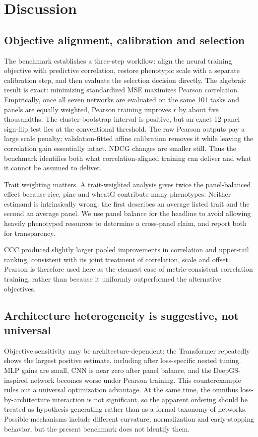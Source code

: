 \section{Discussion}\label{sec:discussion}

\subsection{Objective alignment, calibration and selection}
The benchmark establishes a three-step workflow: align the neural training
objective with predictive correlation, restore phenotypic scale with a separate
calibration step, and then evaluate the selection decision directly. The
algebraic result is exact: minimizing standardized MSE maximizes Pearson
correlation. Empirically, once all seven networks are evaluated on the same 101
tasks and panels are equally weighted, Pearson training improves $r$ by about
five thousandths. The cluster-bootstrap interval is positive, but an exact
12-panel sign-flip test lies at the conventional threshold. The raw Pearson
outputs pay a large scale penalty; validation-fitted affine calibration removes
it while leaving the correlation gain essentially intact. NDCG changes are
smaller still. Thus the benchmark identifies both what correlation-aligned
training can deliver and what it cannot be assumed to deliver.

Trait weighting matters. A trait-weighted analysis gives twice the
panel-balanced effect because rice, pine and wheatG contribute many phenotypes.
Neither estimand is intrinsically wrong: the first describes an average listed
trait and the second an average panel. We use panel balance for the headline to
avoid allowing heavily phenotyped resources to determine a cross-panel claim,
and report both for transparency.

CCC produced slightly larger pooled improvements in correlation and upper-tail
ranking, consistent with its joint treatment of correlation, scale and offset.
Pearson is therefore used here as the cleanest case of metric-consistent
correlation training, rather than because it uniformly outperformed the
alternative objectives.

\subsection{Architecture heterogeneity is suggestive, not universal}
Objective sensitivity may be architecture-dependent: the Transformer repeatedly
shows the largest positive estimate, including after loss-specific nested tuning.
MLP gains are small, CNN is near zero after panel balance, and the DeepGS-inspired
network becomes worse under Pearson training.
This counterexample rules out a universal optimization advantage. At the same
time, the omnibus loss-by-architecture interaction is not significant, so the
apparent ordering should be treated as hypothesis-generating rather than as a
formal taxonomy of networks. Possible mechanisms include different curvature,
normalization and early-stopping behavior, but the present benchmark does not
identify them.

